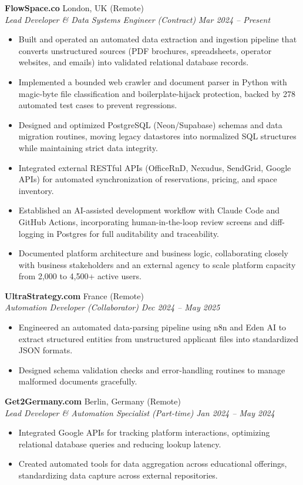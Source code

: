 \documentclass[10pt,a4paper]{article}
\begin{document}
\textbf{FlowSpace.co} \hfill London, UK (Remote) \\
\textit{Lead Developer \& Data Systems Engineer (Contract)} \hfill \textit{Mar 2024 -- Present}
\begin{itemize}
    \item Built and operated an automated data extraction and ingestion pipeline that converts unstructured sources (PDF brochures, spreadsheets, operator websites, and emails) into validated relational database records.
    \item Implemented a bounded web crawler and document parser in Python with magic-byte file classification and boilerplate-hijack protection, backed by 278 automated test cases to prevent regressions.
    \item Designed and optimized PostgreSQL (Neon/Supabase) schemas and data migration routines, moving legacy datastores into normalized SQL structures while maintaining strict data integrity.
    \item Integrated external RESTful APIs (OfficeRnD, Nexudus, SendGrid, Google APIs) for automated synchronization of reservations, pricing, and space inventory.
    \item Established an AI-assisted development workflow with Claude Code and GitHub Actions, incorporating human-in-the-loop review screens and diff-logging in Postgres for full auditability and traceability.
    \item Documented platform architecture and business logic, collaborating closely with business stakeholders and an external agency to scale platform capacity from 2,000 to 4,500+ active users.
\end{itemize}

\vspace{4pt}
\textbf{UltraStrategy.com} \hfill France (Remote) \\
\textit{Automation Developer (Collaborator)} \hfill \textit{Dec 2024 -- May 2025}
\begin{itemize}
    \item Engineered an automated data-parsing pipeline using n8n and Eden AI to extract structured entities from unstructured applicant files into standardized JSON formats.
    \item Designed schema validation checks and error-handling routines to manage malformed documents gracefully.
\end{itemize}

\vspace{4pt}
\textbf{Get2Germany.com} \hfill Berlin, Germany (Remote) \\
\textit{Lead Developer \& Automation Specialist (Part-time)} \hfill \textit{Jan 2024 -- May 2024}
\begin{itemize}
    \item Integrated Google APIs for tracking platform interactions, optimizing relational database queries and reducing lookup latency.
    \item Created automated tools for data aggregation across educational offerings, standardizing data capture across external repositories.
\end{itemize}
\end{document}
